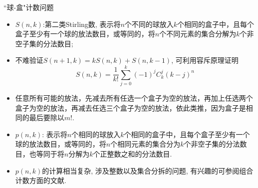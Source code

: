 \documentclass[Prob-All.tex]{subfiles}
\begin{document}
\begin{frame}{``球-盒"计数问题}
	\begin{itemize}
		\item $S(n,k)$:第二类Stirling数, 表示将$n$个不同的球放入$k$个相同的盒子中，且每个盒子至少有一个球的放法数目，或等同的，将$n$个不同元素的集合分解为$k$个非空子集的分法数目;
		\item 不难验证$S(n+1, k)=k S(n, k)+S(n, k-1)$, 可利用容斥原理证明 %
		\[
		S(n, k)=\frac{1}{k!} \sum_{j=0}^{k}(-1)^{j}C_k^j (k-j)^{n}
		\]
\item 任意所有可能的放法，先减去所有任选一个盒子为空的放法，再加上任选两个盒子为空的放法，再减去任选三个盒子为空的放法，依此类推，因为盒子是相同的最后要除以$m!$.
		\item ${p(n, k)}$: 表示将$n$个相同的球放入$k$个相同的盒子中，且每个盒子至少有一个球的放法数目，或等同的，将$n$个相同元素的集合分为$k$个非空子集的分法数目，也等同于将${n}$分解为${k}$个正整数之和的分法数目.
		\item ${p(n, k)}$的计算相当复杂, 涉及整数以及集合分拆的问题, 有兴趣的可参阅组合计数方面的文献.
	\end{itemize}

\end{frame}
\end{document}
